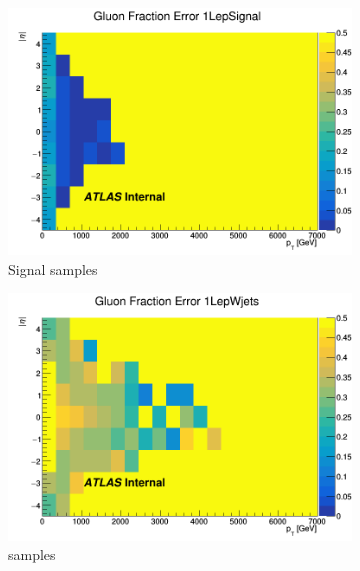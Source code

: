 \begin{figure}[p]
    \centering
    \begin{subfigure}[b]{0.3\textwidth}
        \centering
        \includegraphics[width=\textwidth]{figures/QGfrac/GluonFracError2D_1LepSignal.png}
        \caption{Signal samples}
        \label{fig:GluonFracErrorSignal}
    \end{subfigure}
    \hfill
    \begin{subfigure}[b]{0.3\textwidth}
        \centering
        \includegraphics[width=\textwidth]{figures/QGfrac/GluonFracError2D_1LepWjets.png}
        \caption{\Wjets samples}
        \label{fig:GluonFracErrorWjets}
    \end{subfigure}
    \hfill
    \begin{subfigure}[b]{0.3\textwidth}

\end{subfigure}
\end{figure}
